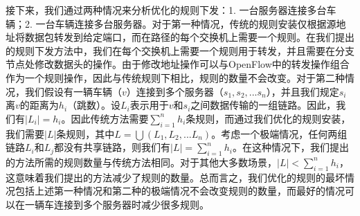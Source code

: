%

接下来，我们通过两种情况来分析优化的规则下发：1. 一台服务器连接多台车辆；2. 一台车辆连接多台服务器。对于第一种情况，传统的规则安装仅根据源地址将数据包转发到给定端口，而在路径的每个交换机上需要一个规则。在我们提出的规则下发方法中，我们在每个交换机上需要一个规则用于转发，并且需要在分支节点处修改数据头的操作。由于修改地址操作可以与OpenFlow中的转发操作组合作为一个规则操作，因此与传统规则下相比，规则的数量不会改变。对于第二种情况，我们假设有一辆车辆（$v$）连接到多个服务器（$s_1,s_2, ... s_n$），并且我们规定$s_i$离$v$的距离为$h_i$（跳数）。设$ L_i $表示用于$ v $和$ s_i $之间数据传输的一组链路。因此，我们有$|L_i| = h_i$。因此传统方法需要$\sum_{i=1}^{n} h_i$条规则，而通过我们优化的规则安装，我们需要$|L|$条规则，其中$L = \bigcup{(L_{1}, L_{2}, ... L_{n})}$。考虑一个极端情况，任何两组链路$L_i$和$L_j$都没有共享链路，则我们有$|L| = \sum_{i=1}^{n} h_i$。在这种情况下，我们提出的方法所需的规则数量与传统方法相同。对于其他大多数场景，$|L| < \sum_{i=1}^{n} h_i$，这意味着我们提出的方法减少了规则的数量。总而言之，我们优化的规则的最坏情况包括上述第一种情况和第二种的极端情况不会改变规则的数量，而最好的情况可以在一辆车连接到多个服务器时减少很多规则。

